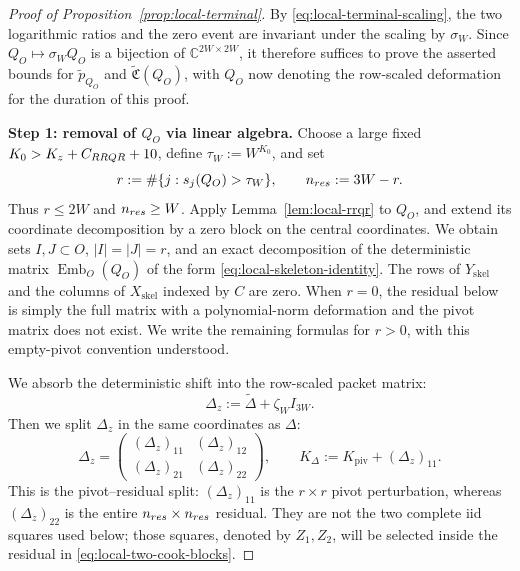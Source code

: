 \documentclass[10pt,a4paper]{amsart}
\newcommand{\C}{\mathbb C}
\begin{document}
\begin{proof}[Proof of Proposition~\ref{prop:local-terminal}]
By \eqref{eq:local-terminal-scaling}, the two logarithmic ratios and the
zero event are invariant under the scaling by $\sigma_W$.  Since
\(Q_O\mapsto\sigma_WQ_O\) is a bijection of
\(\C^{2W\times2W}\), it therefore suffices to prove the asserted bounds
for \(\widetilde p_{Q_O}\) and
\(\widetilde{\mathfrak C}(Q_O)\), with \(Q_O\) now denoting the
row-scaled deformation for the duration of this proof.


\textbf{Step 1: removal of $Q_O$ via linear algebra.}
Choose a large fixed \(K_0>K_z+C_{\rm RRQR}+10\), define
\(\tau_W:=W^{K_0}\), and
set
\begin{equation}
 r:=\#\{j:s_j(Q_O)>\tau_W\},\qquad n_{\rm res}:=3W-r.
 \label{eq:local-r-nres}
\end{equation}
Thus \(r\leq2W\) and \(n_{\rm res}\geq W\).  Apply
Lemma~\ref{lem:local-rrqr} to \(Q_O\), and extend its coordinate
decomposition by a zero block on the central coordinates.  We obtain
sets \(I,J\subset O\), \(|I|=|J|=r\), and an exact decomposition of the
deterministic matrix \(\operatorname{Emb}_O(Q_O)\) of the form
\eqref{eq:local-skeleton-identity}.  The rows of \(Y_{\mathrm{skel}}\) and
the columns of \(X_{\mathrm{skel}}\) indexed by \(C\) are zero.
When \(r=0\), the residual below is simply the
full matrix with a polynomial-norm deformation and the pivot matrix does not exist.  We write the remaining
formulas for \(r>0\), with this empty-pivot convention understood.

We absorb the deterministic shift into the row-scaled packet matrix:
\begin{equation}
 \Delta_z:=\widetilde\Delta+\zeta_WI_{3W}.
 \label{eq:local-Delta-tilde}
\end{equation}
Then we split \(\Delta_z\) in the same coordinates as $\Delta$:
\begin{equation}
 \Delta_z=
 \begin{pmatrix}(\Delta_z)_{11}&(\Delta_z)_{12}\\
                 (\Delta_z)_{21}&(\Delta_z)_{22}\end{pmatrix},
 \qquad
 K_\Delta:=K_{\mathrm{piv}}+(\Delta_z)_{11}.
 \label{eq:local-Delta-split}
\end{equation}
This is the pivot--residual split: \((\Delta_z)_{11}\) is the
\(r\times r\) pivot perturbation, whereas \((\Delta_z)_{22}\) is the
entire \(n_{\rm res}\times n_{\rm res}\) residual.  They are not the two
complete iid squares used below; those squares, denoted by \(Z_1,Z_2\),
will be selected inside the residual in \eqref{eq:local-two-cook-blocks}.


\end{proof}
\end{document}
